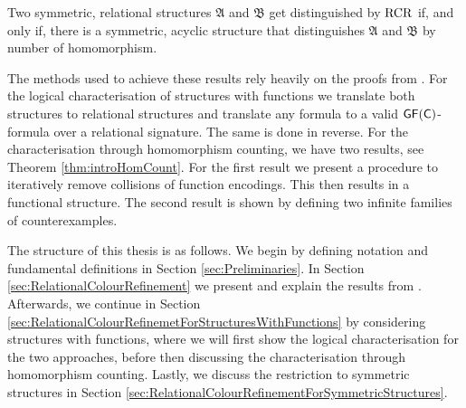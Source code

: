\begin{theorem}
Two symmetric, relational structures $\mathfrak A$ and $\mathfrak B$ get distinguished by $\operatorname{RCR}$ if, and only if, there is a symmetric, acyclic structure that distinguishes $\mathfrak A$ and $\mathfrak B$ by number of homomorphism.
\end{theorem}

The methods used to achieve these results rely heavily on the proofs from \cite{scheidt2025ColorRefinement}.
For the logical characterisation of structures with functions we translate both structures to relational structures and translate any formula to a valid $\mathsf{GF}(\mathsf{C})$-formula over a relational signature.
The same is done in reverse.
For the characterisation through homomorphism counting, we have two results, see Theorem \ref{thm:introHomCount}.
For the first result we present a procedure to iteratively remove collisions of function encodings.
This then results in a functional structure.
The second result is shown by defining two infinite families of counterexamples.

The structure of this thesis is as follows.
We begin by defining notation and fundamental definitions in Section \ref{sec:Preliminaries}.
In Section \ref{sec:RelationalColourRefinement} we present and explain the results from \cite{scheidt2025ColorRefinement}.
Afterwards, we continue in Section \ref{sec:RelationalColourRefinemetForStructuresWithFunctions} by considering structures with functions, where we will first show the logical characterisation for the two approaches, before then discussing the characterisation through homomorphism counting.
Lastly, we discuss the restriction to symmetric structures in Section \ref{sec:RelationalColourRefinementForSymmetricStructures}.




